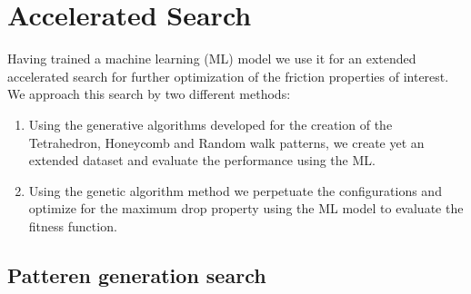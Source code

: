 \section{Accelerated Search}

Having trained a machine learning (\acrshort{ML}) model we use it for an extended accelerated search for further optimization of the friction properties of interest. We approach this search by two different methods:
\begin{enumerate}
  \item Using the generative algorithms developed for the creation of the Tetrahedron, Honeycomb and Random walk patterns, we create yet an extended dataset and evaluate the performance using the \acrshort{ML}.
  \item Using the genetic algorithm method we perpetuate the configurations and optimize for the maximum drop property using the \acrshort{ML} model to evaluate the fitness function. 
\end{enumerate}


\subsection{Patteren generation search}

